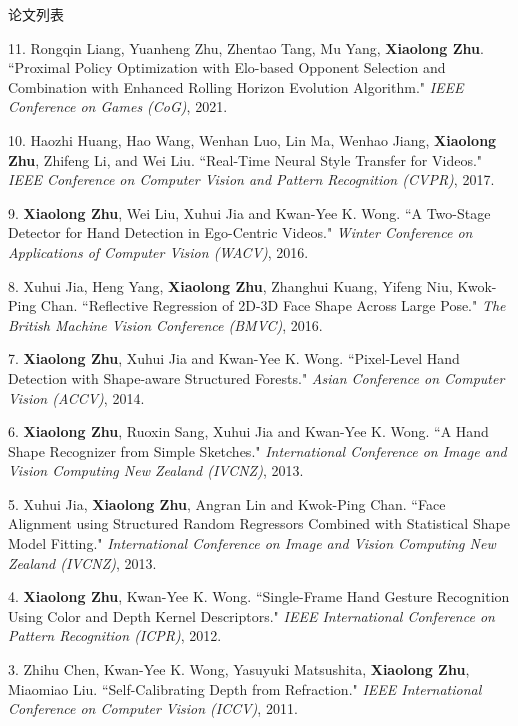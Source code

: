\documentclass[UTF8]{cv_professional-cn} %
\makeatletter
\newlength{\bibhang}
\newlength{\bibsep}
 {\@listi \global\bibsep\itemsep \global\advance\bibsep by\parsep}
\newenvironment{bibsection}%
        {\vspace{\itemsep}\begin{list}{}{%
       \setlength{\leftmargin}{\bibhang}%
       \setlength{\itemsep}{\bibsep}%
       \setlength{\parsep}{\z@}%
        \setlength{\partopsep}{0pt}%
        \setlength{\topsep}{0pt}}}
        {\end{list}\vspace{\itemsep}}
\makeatother
\begin{document}
\begin{rSection}{论文列表}
\begin{bibsection}
    \item[11.]Rongqin Liang, Yuanheng Zhu, Zhentao Tang, Mu Yang, \textbf{Xiaolong Zhu}. ``Proximal Policy Optimization with Elo-based Opponent Selection and Combination with Enhanced Rolling Horizon Evolution Algorithm." \emph{IEEE Conference on Games (CoG)}, 2021.

    \item[10.] Haozhi Huang, Hao Wang, Wenhan Luo, Lin Ma, Wenhao Jiang, \textbf{Xiaolong Zhu}, Zhifeng Li, and Wei Liu. ``Real-Time Neural Style Transfer for Videos." \emph{IEEE Conference on Computer Vision and Pattern Recognition (CVPR)}, 2017.

  \item[9.] \textbf{Xiaolong Zhu}, Wei Liu, Xuhui Jia and Kwan-Yee K. Wong. ``A Two-Stage Detector for Hand Detection in Ego-Centric Videos." \emph{Winter Conference on Applications of Computer Vision (WACV)}, 2016.
  
  \item[8.] Xuhui Jia, Heng Yang, \textbf{Xiaolong Zhu}, Zhanghui Kuang, Yifeng Niu, Kwok-Ping Chan. ``Reflective Regression of 2D-3D Face Shape Across Large Pose." \emph{The British Machine Vision Conference (BMVC)}, 2016.

  \item[7.] \textbf{Xiaolong Zhu}, Xuhui Jia and Kwan-Yee K. Wong. ``Pixel-Level Hand Detection with Shape-aware Structured Forests." \emph{Asian Conference on Computer Vision (ACCV)}, 2014.

  \item[6.] \textbf{Xiaolong Zhu}, Ruoxin Sang, Xuhui Jia and Kwan-Yee K. Wong. ``A Hand Shape Recognizer from Simple Sketches." \emph{International Conference on Image and Vision Computing New Zealand (IVCNZ)}, 2013.

  \item[5.] Xuhui Jia, \textbf{Xiaolong Zhu}, Angran Lin and Kwok-Ping Chan. ``Face Alignment using Structured Random Regressors Combined with Statistical Shape Model Fitting." \emph{International Conference on Image and Vision Computing New Zealand (IVCNZ)}, 2013.

  \item[4.] \textbf{Xiaolong Zhu}, Kwan-Yee K. Wong. ``Single-Frame Hand Gesture Recognition Using Color and Depth Kernel Descriptors." \emph{IEEE International Conference on Pattern Recognition (ICPR)}, 2012.

  \item[3.] Zhihu Chen, Kwan-Yee K. Wong, Yasuyuki Matsushita, \textbf{Xiaolong Zhu}, Miaomiao Liu. ``Self-Calibrating Depth from Refraction." \emph{IEEE International Conference on Computer Vision (ICCV)}, 2011.


\end{bibsection}
\end{rSection}
\end{document}
